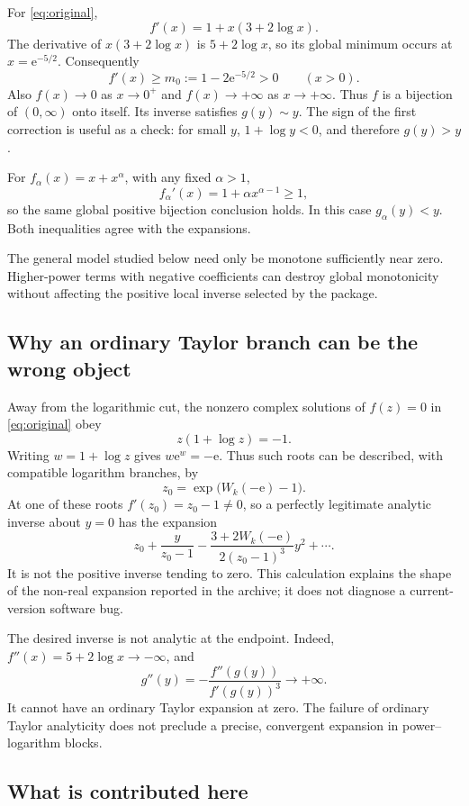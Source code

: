 \documentclass[11pt,a4paper]{article}
\theoremstyle{definition}
\theoremstyle{remark}
\newcommand{\ee}{\mathrm e}
\begin{document}
For \eqref{eq:original},
\[
 f'(x)=1+x(3+2\log x).
\]
The derivative of $x(3+2\log x)$ is $5+2\log x$, so its global minimum occurs at
$x=\ee^{-5/2}$. Consequently
\begin{equation}\label{eq:global-slope}
 f'(x)\ge m_0:=1-2\ee^{-5/2}>0\qquad(x>0).
\end{equation}
Also $f(x)\to0$ as $x\to0^+$ and $f(x)\to+\infty$ as $x\to+\infty$.
Thus $f$ is a bijection of $(0,\infty)$ onto itself. Its inverse satisfies
$g(y)\sim y$. The sign of the first correction is useful as a check: for small
$y$, $1+\log y<0$, and therefore $g(y)>y$.

For $f_\alpha(x)=x+x^\alpha$, with any fixed $\alpha>1$,
\[
 f_\alpha'(x)=1+\alpha x^{\alpha-1}\ge1,
\]
so the same global positive bijection conclusion holds. In this case
$g_\alpha(y)<y$. Both inequalities agree with the expansions.

The general model studied below need only be monotone sufficiently near zero.
Higher-power terms with negative coefficients can destroy global monotonicity
without affecting the positive local inverse selected by the package.

\subsection{Why an ordinary Taylor branch can be the wrong object}

Away from the logarithmic cut, the nonzero complex solutions of $f(z)=0$ in
\eqref{eq:original} obey
\[
 z(1+\log z)=-1.
\]
Writing $w=1+\log z$ gives $w\ee^w=-\ee$. Thus such roots can be described,
with compatible logarithm branches, by
\[
 z_0=\exp\bigl(W_k(-\ee)-1\bigr).
\]
At one of these roots $f'(z_0)=z_0-1\ne0$, so a perfectly legitimate analytic
inverse about $y=0$ has the expansion
\[
 z_0+\frac{y}{z_0-1}
 -\frac{3+2W_k(-\ee)}{2(z_0-1)^3}y^2+\cdots.
\]
It is not the positive inverse tending to zero. This calculation explains the
shape of the non-real expansion reported in the archive; it does not diagnose
a current-version software bug.

The desired inverse is not analytic at the endpoint. Indeed,
$f''(x)=5+2\log x\to-\infty$, and
\[
 g''(y)=-\frac{f''(g(y))}{f'(g(y))^3}\longrightarrow+\infty.
\]
It cannot have an ordinary Taylor expansion at zero. The failure of ordinary
Taylor analyticity does not preclude a precise, convergent expansion in
power--logarithm blocks.

\subsection{What is contributed here}
\end{document}
